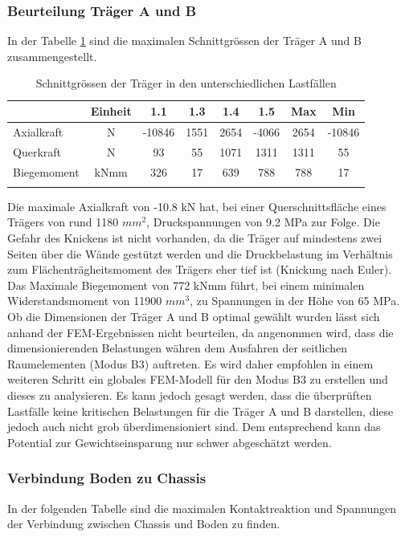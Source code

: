 \subsubsection{Beurteilung Träger A und B}
In der Tabelle \ref{tab:FEMres Träger} sind die maximalen Schnittgrössen der Träger A und B zusammengestellt.
\begin{table}[H]
\centering
\begin{tabular}{lccccccc}
\thickhline
	&	Einheit	&	1.1	&	1.3	&	1.4	&	1.5	&	Max	&	Min	\\	\hline
Axialkraft	&	N	&	-10846	&	1551	&	2654	&	-4066	&	2654	&	-10846	\\
Querkraft	&	N	&	93	&	55	&	1071	&	1311	&	1311	&	55	\\
Biegemoment	&	kNmm	&	326	&	17	&	639	&	788	&	788	&	17	\\	\thickhline
\end{tabular}
\caption{Schnittgrössen der Träger in den unterschiedlichen Lastfällen}
\label{tab:FEMres Träger}
\end{table}


Die maximale Axialkraft von -10.8 kN hat, bei einer Querschnittsfläche eines Trägers von rund 1180 $mm^2$, Druckspannungen von 9.2 MPa zur Folge. Die Gefahr des Knickens ist nicht vorhanden, da die Träger auf mindestens zwei Seiten über die Wände gestützt werden und die Druckbelastung im Verhältnis zum Flächenträgheitsmoment des Trägers eher tief ist (Knickung nach Euler). Das Maximale Biegemoment von 772 kNmm führt, bei einem minimalen Widerstandsmoment von 11900 $mm^3$, zu Spannungen in der Höhe von 65 MPa.\\
Ob die Dimensionen der Träger A und B optimal gewählt wurden lässt sich anhand der FEM-Ergebnissen nicht beurteilen, da angenommen wird, dass die dimensionierenden Belastungen währen dem Ausfahren der seitlichen Raumelementen (Modus B3) auftreten. Es wird daher empfohlen in einem weiteren Schritt ein globales FEM-Modell für den Modus B3 zu erstellen und dieses zu analysieren. Es kann jedoch gesagt werden, dass die überprüften Lastfälle keine kritischen Belastungen für die Träger A und B darstellen, diese jedoch auch nicht grob überdimensioniert sind. Dem entsprechend kann das Potential zur Gewichtseinsparung nur schwer abgeschätzt werden.

\subsubsection{Verbindung Boden zu Chassis}
In der folgenden Tabelle sind die maximalen Kontaktreaktion und Spannungen der Verbindung zwischen Chassis und Boden zu finden.

